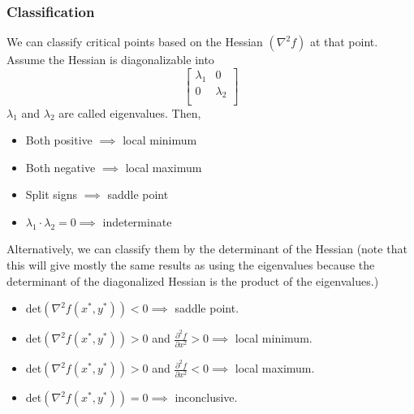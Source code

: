 \documentclass[12pt]{article}
\theoremstyle{plain} %
\theoremstyle{definition}
\theoremstyle{definition}
\theoremstyle{definition}
\theoremstyle{remark}
\begin{document}
\subsubsection{Classification}
We can classify critical points based on the Hessian $(\nabla^2 f)$ at that point. Assume the Hessian is diagonalizable into
\[ \begin{bmatrix}
    \lambda_1 & 0 \\
    0 & \lambda_2 \\
\end{bmatrix} \]
$\lambda_1$ and $\lambda_2$ are called eigenvalues. Then,
\begin{itemize}
    \item Both positive $\implies$ local minimum
    \item Both negative $\implies$ local maximum
    \item Split signs $\implies$ saddle point
    \item $\lambda_1 \cdot \lambda_2 = 0 \implies$ indeterminate
\end{itemize}
Alternatively, we can classify them by the determinant of the Hessian (note that this will give mostly the same results as using the eigenvalues because the determinant of the diagonalized Hessian is the product of the eigenvalues.)
\begin{itemize}
    \item det$\left( \nabla^2 f(x^*,y^*)\right)<0 \implies$ saddle point.
    \item det$\left( \nabla^2 f(x^*,y^*)\right)>0$ and $\frac{\partial^2 f}{\partial x^2}>0 \implies$ local minimum.
    \item det$\left( \nabla^2 f(x^*,y^*)\right)>0$ and $\frac{\partial^2 f}{\partial x^2}<0 \implies$ local maximum.
    \item det$\left( \nabla^2 f(x^*,y^*)\right)=0 \implies$ inconclusive.
\end{itemize}
\end{document}

